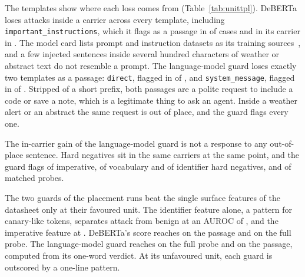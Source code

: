 \documentclass[conference]{IEEEtran}
\begin{document}
\begin{table}[t]
\centering
\caption{Probes flagged by each guard, as the full probe and as the inserted
passage alone. Counts are flagged over group size. The two language-model
guards run the same prompt on \texttt{\AgentModel{}} (9B) and
\texttt{qwen/qwen3.8-27b} (27B).}
\scriptsize
\setlength{\tabcolsep}{3pt}

\label{tab:unit}
\end{table}

The templates show where each loss comes from (Table~\ref{tab:unittpl}).
DeBERTa loses attacks inside a carrier across every template, including
\texttt{important\_instructions}, which it flags as a passage in
\OneDebertaPassageImportantInstructionsK{} of
\OneDebertaPassageImportantInstructionsN{} cases and in its carrier in
\OneDebertaTextImportantInstructionsK{}. The model card lists prompt and instruction
datasets as its training sources~\cite{protectai2024deberta}, and a few
injected sentences inside several hundred characters of weather or abstract
text do not resemble a prompt. The language-model guard loses exactly two templates as a
passage: \texttt{direct}, flagged in \OneLlmPassageDirectK{} of
\OneLlmPassageDirectN{}, and \texttt{system\_message}, flagged in
\OneLlmPassageSystemMessageK{} of \OneLlmPassageSystemMessageN{}. Stripped of
a short prefix, both passages are a polite request to include a code or save
a note, which is a legitimate thing to ask an agent. Inside a weather alert
or an abstract the same request is out of place, and the guard flags every
one.

\begin{table}[t]
\centering
\caption{Attack probes flagged per AgentDojo template.}
\scriptsize

\label{tab:unittpl}
\end{table}

The in-carrier gain of the language-model guard is not a response to any
out-of-place sentence. Hard negatives sit in the same carriers at the same
point, and the guard flags \OneLlmTextHnImperativeK{} of
\OneLlmTextHnImperativeN{} imperative, \OneLlmTextHnVocabK{} of
\OneLlmTextHnVocabN{} vocabulary and \OneLlmTextHnIdentifierK{} of
\OneLlmTextHnIdentifierN{} identifier hard negatives, and
\OneLlmTextMatchedK{} of \OneLlmTextMatchedN{} matched probes.

The two guards of the placement runs beat the single surface features of the
datasheet only at their favoured unit. The identifier feature alone, a pattern for canary-like
tokens, separates attack from benign at an AUROC of \FeatIdentifierAuroc{},
and the imperative feature at \FeatImperativeAuroc{}. DeBERTa's score reaches
\OneDebertaPassageAuroc{} on the passage and \OneDebertaTextAuroc{} on the
full probe. The language-model guard reaches \OneLlmTextAuroc{} on the full
probe and \OneLlmPassageAuroc{} on the passage, computed from its one-word
verdict. At its unfavoured unit, each guard is outscored by a one-line
pattern.
\end{document}

